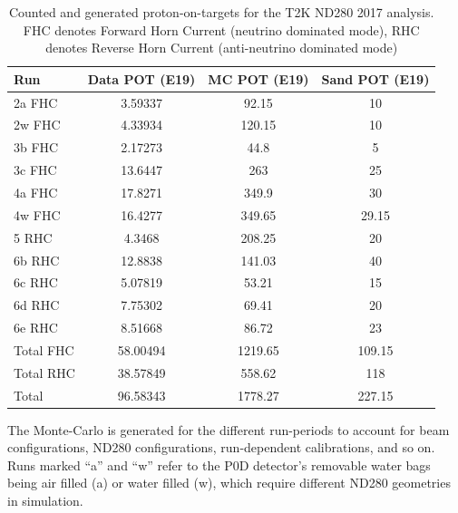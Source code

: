 \begin{table}[h]
	\centering
	\begin{tabular}{ l c c c }
		\hline
		Run & Data POT (E19) & MC POT (E19) & Sand POT (E19) \\
		\hline
		\hline
		2a  FHC & 3.59337    & 92.15       & 10 \\
		2w  FHC & 4.33934    & 120.15      & 10 \\
		\hline
		3b FHC  & 2.17273    & 44.8        & 5 \\
		3c FHC  & 13.6447    & 263         & 25 \\
		\hline
		4a FHC  & 17.8271    & 349.9       & 30 \\
		4w FHC  & 16.4277    & 349.65      & 29.15 \\
		\hline
		5 RHC & 4.3468     & 208.25      & 20 \\
		\hline
		6b RHC & 12.8838    & 141.03      & 40 \\
		6c RHC & 5.07819    & 53.21       & 15 \\
		6d RHC & 7.75302    & 69.41       & 20 \\
		6e RHC & 8.51668    & 86.72       & 23 \\
		\hline
		\hline
		Total FHC & 58.00494 & 1219.65 & 109.15\\
		Total RHC & 38.57849 & 558.62  & 118 \\
		\hline
		Total & 96.58343 & 1778.27 & 227.15 \\
		\hline
	\end{tabular}
	\caption{Counted and generated proton-on-targets for the T2K ND280 2017 analysis. FHC denotes Forward Horn Current (neutrino dominated mode), RHC denotes Reverse Horn Current (anti-neutrino dominated mode)}
	\label{tab:pot_2017}
\end{table}
The Monte-Carlo is generated for the different run-periods to account for beam configurations, ND280 configurations, run-dependent calibrations, and so on. Runs marked ``a'' and ``w'' refer to the P0D detector's removable water bags being air filled (a) or water filled (w), which require different ND280 geometries in simulation.

